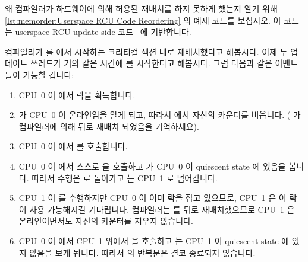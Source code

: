 {	왜 컴파일러가 하드웨어에 의해 허용된 재배치를 하지 못하게 했는지 알기
	위해
	\cref{lst:memorder:Userspace RCU Code Reordering} 의 예제 코드를
	보십시오.
	이 코드는 userspace RCU update-side
	코드~\cite[Supplementary Materials Figure 5]{MathieuDesnoyers2012URCU}
	에 기반합니다.

\begin{fcvref}
	컴파일러가  를  에서 시작하는
	크리티컬 섹션 내로 재배치했다고 해봅시다.
	이제 두 업데이트 쓰레드가 거의 같은 시간에  를
	시작한다고 해봅시다.
	그럼 다음과 같은 이벤트들이 가능할 겁니다:

	\begin{enumerate}
	\item	CPU~0 이  에서 락을 획득합니다.
	\item	{} 가 CPU~0 이 온라인임을 알게 되고, 따라서
		 에서 자신의 카운터를 비웁니다.
		( 가 컴파일러에 의해  뒤로
		재배치 되었음을 기억하세요).
	\item	CPU~0 이  에서  를
		호출합니다.
	\item	CPU~0 이  에서 스스로  을
		호출하고  가 CPU~0 이 quiescent state 에 있음을
		봅니다.
		따라서 수행은  로 돌아가고
		 는 CPU~1 로 넘어갑니다.
	\item	CPU~1 이  를 수행하지만 CPU~0 이 이미
		락을 잡고 있으므로, CPU~1 은 이 락이 사용 가능해지길
		기다립니다.
		컴파일러는  를  뒤로
		재배치했으므로 CPU~1 은 온라인이면서도 자신의 카운터를 지우지
		않습니다.
	\item	CPU~0 이  에서 CPU~1 위에서 
		을 호출하고  는 CPU~1 이 quiescent state 에 있지
		않음을 보게 됩니다.
		따라서  의  반복문은 결코 종료되지
		않습니다.


\end{enumerate}
\end{fcvref}}
